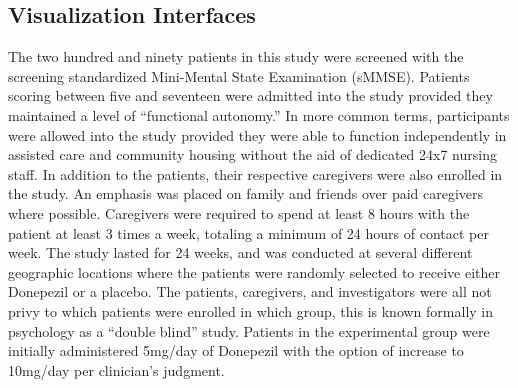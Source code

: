 \subsection{Visualization Interfaces}
The two hundred and ninety patients in this study were screened with the screening standardized Mini-Mental State Examination (sMMSE).  Patients scoring between five and seventeen were admitted into the study provided they maintained a level of “functional autonomy.”  In more common terms, participants were allowed into the study provided they were able to function independently in assisted care and community housing without the aid of dedicated 24x7 nursing staff.  In addition to the patients, their respective caregivers were also enrolled in the study.  An emphasis was placed on family and friends over paid caregivers where possible.  Caregivers were required to spend at least 8 hours with the patient at least 3 times a week, totaling a minimum of 24 hours of contact per week.  The study lasted for 24 weeks, and was conducted at several different geographic locations where the patients were randomly selected to receive either Donepezil or a placebo.  The patients, caregivers, and investigators were all not privy to which patients were enrolled in which group, this is known formally in psychology as a “double blind” study.  Patients in the experimental group were initially administered 5mg/day of Donepezil with the option of increase to 10mg/day per clinician’s judgment. 

